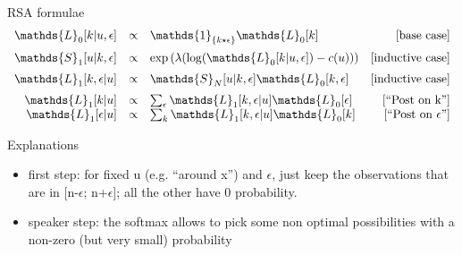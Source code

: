 \documentclass[xcolor=table, hyperref={pdfpagelabels=false}]{beamer}
\begin{document}
\begin{frame}{RSA formulae}
\begin{equation*}
\begin{array}{rclr}
\mathds{L}_0[k|u, \epsilon] &\propto& \mathds{1}_{\lbrace k \star \epsilon \rbrace} \mathds{L}_0[k] &\mbox{[base case]} \vspace{2mm} \\ \vspace{2mm}
\mathds{S}_1[u|k, \epsilon] &\propto& \exp \left( \lambda (\log(\mathds{L}_{0}[k|u,\epsilon]) - c(u))\right) & \mbox{[inductive case]}\\ \vspace{2mm}

\mathds{L}_1[k, \epsilon|u] &\propto& \mathds{S}_N[u|k, \epsilon] \mathds{L}_0[k,\epsilon] & \mbox{[inductive case]}\\
\mathds{L}_1[k|u] &\propto& \sum_{\epsilon}\mathds{L}_1[k, \epsilon|u] \mathds{L}_0[\epsilon] & \mbox{[``Post on k'']}\\
\mathds{L}_1[\epsilon|u] &\propto& \sum_{k}\mathds{L}_1[k, \epsilon|u] \mathds{L}_0[k] & \mbox{[``Post on $\epsilon$'']}\\
\end{array}
\end{equation*}

\begin{block}{Explanations}
	\begin{itemize}
		\item first step: for fixed u (e.g. ``around x'') and $\epsilon$, just keep the observations that are in [n-$\epsilon$; n+$\epsilon$]; all the other have 0 probability.
		\item speaker step: the softmax allows to pick some non optimal possibilities with a non-zero (but very small) probability
	\end{itemize}
\end{block}
\end{frame}
\end{document}
